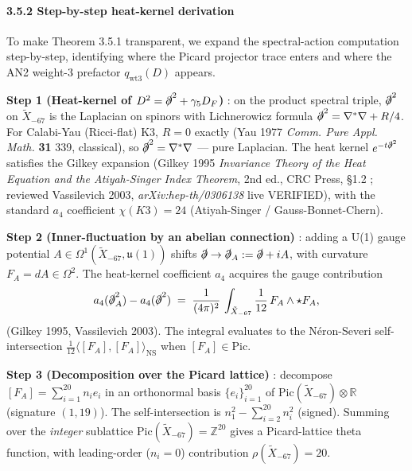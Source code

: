 \documentclass[
  11pt,
  a4paper,
]{article}
\begin{document}
\hypertarget{step-by-step-heat-kernel-derivation}{%
\paragraph{3.5.2 Step-by-step heat-kernel derivation}\label{step-by-step-heat-kernel-derivation}}

To make Theorem 3.5.1 transparent, we expand the spectral-action computation step-by-step, identifying where the Picard projector trace enters and where the AN2 weight-3 prefactor \(q_{\mathrm{wt3}}(D)\) appears.

\textbf{Step 1 (Heat-kernel of \(D^2 = \slashed\partial^2 + \gamma_5 D_F\))} : on the product spectral triple, \(\slashed\partial^2\) on \(\tilde X_{-67}\) is the Laplacian on spinors with Lichnerowicz formula \(\slashed\partial^2 = \nabla^* \nabla + R/4\). For Calabi-Yau (Ricci-flat) K3, \(R = 0\) exactly (Yau 1977 \emph{Comm. Pure Appl. Math.} \textbf{31} 339, classical), so \(\slashed\partial^2 = \nabla^*\nabla\) --- pure Laplacian. The heat kernel \(e^{-t\slashed\partial^2}\) satisfies the Gilkey expansion (Gilkey 1995 \emph{Invariance Theory of the Heat Equation and the Atiyah-Singer Index Theorem}, 2nd ed., CRC Press, §1.2 ; reviewed Vassilevich 2003, \emph{arXiv:hep-th/0306138} live VERIFIED), with the standard \(a_4\) coefficient \(\chi(K3) = 24\) (Atiyah-Singer / Gauss-Bonnet-Chern).

\textbf{Step 2 (Inner-fluctuation by an abelian connection)} : adding a U(1) gauge potential \(A \in \Omega^1(\tilde X_{-67}, \mathfrak u(1))\) shifts \(\slashed\partial \to \slashed\partial_A := \slashed\partial + iA\), with curvature \(F_A = dA \in \Omega^2\). The heat-kernel coefficient \(a_4\) acquires the gauge contribution
\[
a_4(\slashed\partial_A^2) - a_4(\slashed\partial^2) \;=\; \frac{1}{(4\pi)^2}\,\int_{\tilde X_{-67}} \frac{1}{12}\,F_A \wedge \star F_A,
\]
(Gilkey 1995, Vassilevich 2003). The integral evaluates to the Néron-Severi self-intersection \(\frac{1}{12} \langle [F_A], [F_A]\rangle_{\mathrm{NS}}\) when \([F_A] \in \mathrm{Pic}\).

\textbf{Step 3 (Decomposition over the Picard lattice)} : decompose \([F_A] = \sum_{i=1}^{20} n_i e_i\) in an orthonormal basis \(\{e_i\}_{i=1}^{20}\) of \(\mathrm{Pic}(\tilde X_{-67}) \otimes \mathbb R\) (signature \((1, 19)\)). The self-intersection is \(n_1^2 - \sum_{i=2}^{20} n_i^2\) (signed). Summing over the \emph{integer} sublattice \(\mathrm{Pic}(\tilde X_{-67}) = \mathbb Z^{20}\) gives a Picard-lattice theta function, with leading-order (\(n_i = 0\)) contribution \(\rho(\tilde X_{-67}) = 20\).
\end{document}
